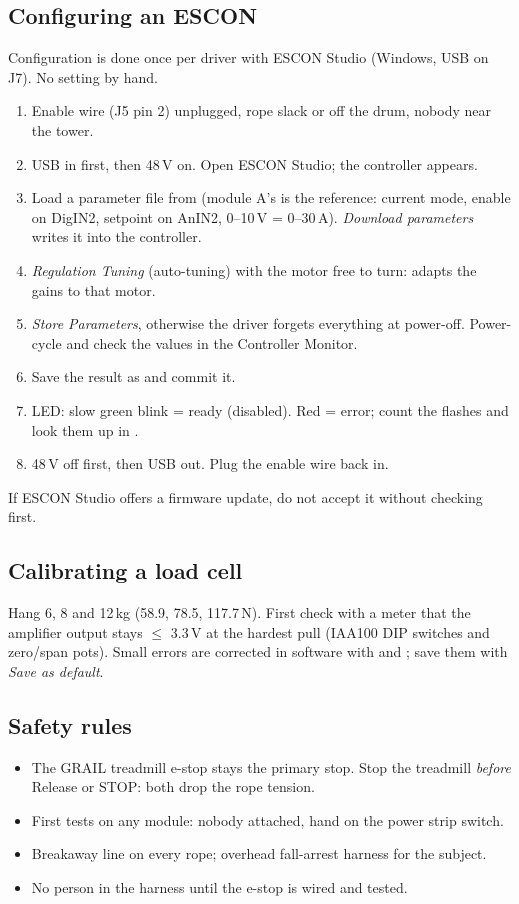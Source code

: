 \subsection{Configuring an ESCON}\label{sec:escon}
Configuration is done once per driver with ESCON Studio (Windows, USB on J7). No setting by hand.
\begin{enumerate}
\item Enable wire (J5 pin 2) unplugged, rope slack or off the drum, nobody near the tower.
\item USB in first, then 48\,V on. Open ESCON Studio; the controller appears.
\item Load a parameter file from  (module A's is the reference: current mode, enable on
DigIN2, setpoint on AnIN2, 0--10\,V = 0--30\,A). \emph{Download parameters} writes it into the
controller.
\item \emph{Regulation Tuning} (auto-tuning) with the motor free to turn: adapts the gains to that motor.
\item \emph{Store Parameters}, otherwise the driver forgets everything at power-off. Power-cycle and check
the values in the Controller Monitor.
\item Save the result as  and commit it.
\item LED: slow green blink = ready (disabled). Red = error; count the flashes and look them up in
.
\item 48\,V off first, then USB out. Plug the enable wire back in.
\end{enumerate}
If ESCON Studio offers a firmware update, do not accept it without checking first.

\subsection{Calibrating a load cell}\label{sec:calibration}
Hang 6, 8 and 12\,kg (58.9, 78.5, 117.7\,N). First check with a meter that the amplifier output stays
$\leq$ 3.3\,V at the hardest pull (IAA100 DIP switches and zero/span pots). Small errors are corrected in
software with  and ; save them with \emph{Save as default}.

\subsection{Safety rules}
\begin{itemize}
\item The GRAIL treadmill e-stop stays the primary stop. Stop the treadmill \emph{before} Release or STOP:
both drop the rope tension.
\item First tests on any module: nobody attached, hand on the power strip switch.
\item Breakaway line on every rope; overhead fall-arrest harness for the subject.
\item No person in the harness until the e-stop is wired and tested.
\end{itemize}
